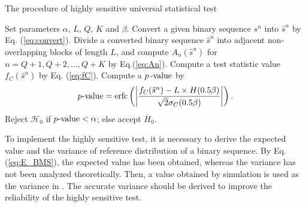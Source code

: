 \begin{algorithm}[h]
\caption{The procedure of highly sensitive universal statistical test}
\label{alg:highly}
\begin{algorithmic}[1]
\State Set parameters $\alpha,\,L,\, Q,\,K$ and $\beta$.
\State Convert a given binary sequence $s^n$ into $\hat{s}^n$ by Eq. (\ref{eq:convert}).
\State Divide a converted binary sequence $\hat{s}^n$ into adjacent non-overlapping blocks of length $L$, and compute $A_n(\hat{s}^n)$ for $n=Q+1,Q+2,\dots,Q+K$ by Eq.(\ref{eq:An}). \label{state:divide}
\State Compute a test statistic value $f_C(\hat{s}^n)$ by Eq. (\ref{eq:fC}).
\State Compute a $p \, \mathchar`- \mathrm{value}$ by
\begin{align}
	 p\mathchar`- \mathrm{value} = \mathrm{erfc} \left( \left| \frac{f_C(\hat{s}^n) - L\times H(0.5\beta)}{\sqrt{2} \sigma_C(0.5\beta)} \right| \right).
\end{align}
\State Reject $\mathcal{H}_0$ if $p\mathchar`- \mathrm{value} < \alpha$; else accept $\overline{H}_0$.
\end{algorithmic}
\end{algorithm}
%
\par
%
To implement the highly sensitive test, it is necessary to derive the expected value and the variance of reference distribution of a binary sequence.
%
By Eq. (\ref{eq:E_BMS}), the expected value has been obtained, whereas the variance has not been analyzed theoretically. Then, a value obtained by simulation is used as the variance in \cite{yamamoto2016highly}. The accurate variance should be derived to improve the reliability of the highly sensitive test.
%
